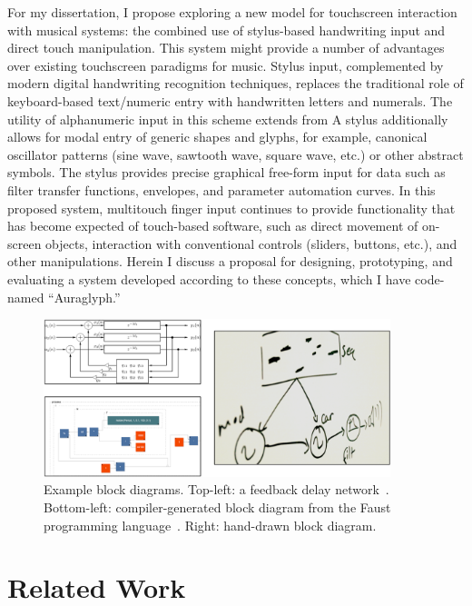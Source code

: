 \documentclass[10pt,letterpaper]{article}
\begin{document}
For my dissertation, I propose exploring a new model for touchscreen interaction with musical systems: the combined use of stylus-based handwriting input and direct touch manipulation. 
This system might provide a number of advantages over existing touchscreen paradigms for music. 
Stylus input, complemented by modern digital handwriting recognition techniques, replaces the traditional role of keyboard-based text/numeric entry with handwritten letters and numerals.
The utility of alphanumeric input in this scheme extends from 
A stylus additionally allows for modal entry of generic shapes and glyphs, for example, canonical oscillator patterns (sine wave, sawtooth wave, square wave, etc.) or other abstract symbols.
The stylus provides precise graphical free-form input for data such as filter transfer functions, envelopes, and parameter automation curves. 
In this proposed system, multitouch finger input continues to provide functionality that has become expected of touch-based software, such as direct movement of on-screen objects, interaction with conventional controls (sliders, buttons, etc.), and other manipulations. 
Herein I discuss a proposal for designing, prototyping, and evaluating a system developed according to these concepts, which I have code-named ``Auraglyph.'' 

\begin{figure}[h!]
	\centering
		\includegraphics[width=0.9\textwidth]{figures/block.png}
	\caption{Example block diagrams. Top-left: a feedback delay network\protect~\cite{smith2010pasp}. Bottom-left: compiler-generated block diagram from the Faust programming language\protect~\cite{faustOnline}. Right: hand-drawn block diagram.}
	\label{fig:blockDiagram}
\end{figure}

\section{Related Work}
\label{sec:RelatedWork}
\end{document}
